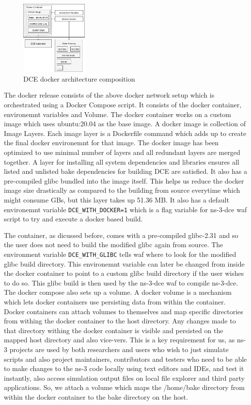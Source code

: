 \documentclass{sig-alternate}
\begin{document}
\begin{figure}[!htb]
  \centering
    \includegraphics[width=0.30\textwidth]{figs/docker-architecture.jpg}

  \caption{DCE docker architecture composition}
  \label{fig:docker}
\end{figure}


The docker release consists of the above docker network setup which is orchestrated using a Docker Compose script. 
It consists of the docker container, environemnt variables and Volume. The docker 
container works on a custom image which uses ubuntu:20.04 as the base image. A docker image is collection of Image Layers. Each image layer is a 
Dockerfile command which adds up to create the final docker environemnt for that image. The docker image has been optimized to use minimal number of layers and 
all redundant layers are merged together. A layer for installing all system dependencies and libraries ensures all listed and unlisted bake 
dependencies for building DCE are satisfied. It also has a pre-compiled glibc bundled into the image itself. This helps us reduce the docker 
image size drastically as compared to the building from source everytime which might consume GBs, but this layer takes up 51.36 MB.
It also has a default environemnt variable 
\texttt{DCE\_WITH\_DOCKER=1} which is a flag variable for ns-3-dce waf script to try and execute a docker based build.

The container, as dicussed before, comes with a pre-compiled glibc-2.31 and so the user does not need to build the modified glibc again from source.
The environment variable \texttt{DCE\_WITH\_GLIBC} tells waf where to look for the modified glibc build directory. This environemnt variable can 
later be changed from inside the docker container to point to a custom glibc build directory if the user wishes to do so. This glibc build is then 
used by the ns-3-dce waf to compile ns-3-dce. The docker compose also sets up a volume. A docker volume is a mechanism which lets docker containers 
use persisting data from within the container. Docker containers can attach volumes to themselves
and map specific directories from withing the docker container to the host directory. Any changes made to that directory withing the  docker container
is visible and persisted on the mapped host directory and also vice-vers. This is a key requirement for us, as ns-3 projects are used by both 
researchers and users who wish to just simulate scripts and also project maintainers, contributors and testers who need to be able to make changes 
to the ns-3 code locally using text editors and IDEs, and test it instantly, also access simulation output files on local file explorer and 
third party applications. So, we attach a volume which maps the /home/bake directory from within the docker container to the bake directory on 
the host.
\end{document}
